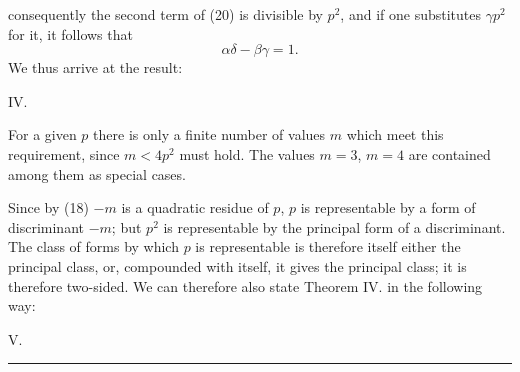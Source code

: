 consequently the second term of (20) is divisible by $p^2$, and if
one substitutes $\gamma p^2$ for it, it follows that
\[
\alpha\delta - \beta\gamma = 1.
\]
We thus arrive at the result:

IV. 

For a given $p$ there is only a finite number of
values $m$ which meet this requirement, since $m < 4p^2$ must
hold. The values $m=3$, $m=4$ are contained among them as special
cases.

Since by (18) $-m$ is a quadratic residue of $p$, $p$
is representable by a form of discriminant $-m$; but $p^2$ is
representable by the principal form of a discriminant. The
class of forms by which $p$ is representable is therefore itself either
the principal class, or, compounded with itself, it gives the
principal class; it is therefore two-sided. We can therefore also
state Theorem IV. in the following way:

V. 

\begin{center}\rule{0.18\linewidth}{0.4pt}\end{center}

